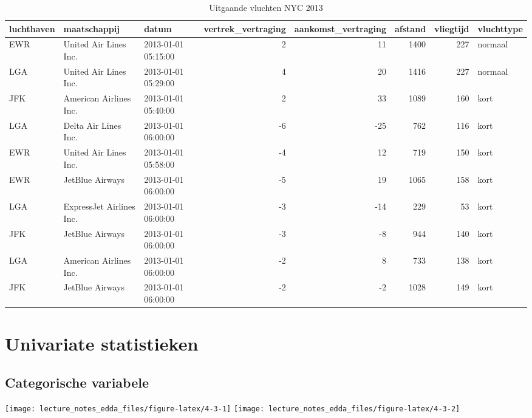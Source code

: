 \documentclass[]{memoir}
\begin{document}
\begin{table}[t]

\caption{\label{tab:4-2b}Uitgaande vluchten NYC 2013}
\centering
\fontsize{10}{12}\selectfont
\begin{tabular}{lllrrrrl}
\toprule
luchthaven & maatschappij & datum & vertrek\_vertraging & aankomst\_vertraging & afstand & vliegtijd & vluchttype\\
\midrule
EWR & United Air Lines Inc. & 2013-01-01 05:15:00 & 2 & 11 & 1400 & 227 & normaal\\
LGA & United Air Lines Inc. & 2013-01-01 05:29:00 & 4 & 20 & 1416 & 227 & normaal\\
JFK & American Airlines Inc. & 2013-01-01 05:40:00 & 2 & 33 & 1089 & 160 & kort\\
LGA & Delta Air Lines Inc. & 2013-01-01 06:00:00 & -6 & -25 & 762 & 116 & kort\\
EWR & United Air Lines Inc. & 2013-01-01 05:58:00 & -4 & 12 & 719 & 150 & kort\\
\addlinespace
EWR & JetBlue Airways & 2013-01-01 06:00:00 & -5 & 19 & 1065 & 158 & kort\\
LGA & ExpressJet Airlines Inc. & 2013-01-01 06:00:00 & -3 & -14 & 229 & 53 & kort\\
JFK & JetBlue Airways & 2013-01-01 06:00:00 & -3 & -8 & 944 & 140 & kort\\
LGA & American Airlines Inc. & 2013-01-01 06:00:00 & -2 & 8 & 733 & 138 & kort\\
JFK & JetBlue Airways & 2013-01-01 06:00:00 & -2 & -2 & 1028 & 149 & kort\\
\bottomrule
\end{tabular}
\end{table}

\hypertarget{univariate-statistieken}{%
\section{Univariate statistieken}\label{univariate-statistieken}}

\hypertarget{categorische-variabele-1}{%
\subsection{Categorische variabele}\label{categorische-variabele-1}}

\texttt{[image: lecture\_notes\_edda\_files/figure-latex/4-3-1]}
\texttt{[image: lecture\_notes\_edda\_files/figure-latex/4-3-2]}
\end{document}
